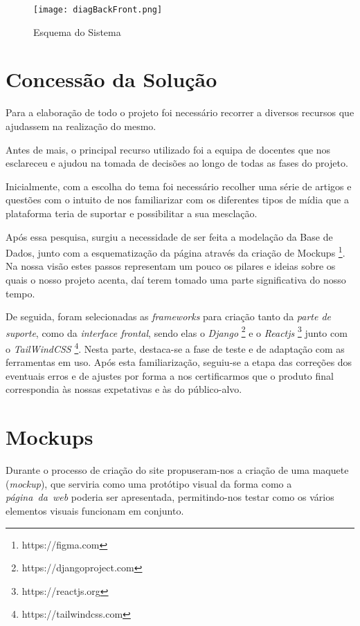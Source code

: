 \documentclass[11pt,a4paper]{report}
\begin{document}
\begin{figure}[h]
    \centering
    \texttt{[image: diagBackFront.png]}
    \caption{Esquema do Sistema}
    \label{fig:sis}
\end{figure}

\chapter{Concessão da Solução}

Para a elaboração de todo o projeto foi necessário recorrer a diversos recursos que ajudassem na realização do mesmo.

Antes de mais, o principal recurso utilizado foi a equipa de docentes que nos esclareceu e ajudou na tomada de decisões ao longo de todas as fases do projeto.

Inicialmente, com a escolha do tema foi necessário recolher uma série de artigos e questões com o intuito de nos familiarizar com os diferentes tipos de mídia que a plataforma teria de suportar e possibilitar a sua mesclação. 

Após essa pesquisa, surgiu a necessidade de ser feita a modelação da Base de Dados, junto com a esquematização da página através da criação de Mockups \footnote{https://figma.com}. Na nossa visão estes passos representam um pouco os pilares e ideias sobre os quais o nosso projeto acenta, daí terem tomado uma parte significativa do nosso tempo.

De seguida, foram selecionadas as \emph{frameworks} para criação tanto da \emph{parte de suporte}, como da \emph{interface frontal}, sendo elas o \emph{Django} \footnote{https://djangoproject.com} e o \emph{Reactjs} \footnote{https://reactjs.org} junto com o \emph{TailWindCSS} \footnote{https://tailwindcss.com}. Nesta parte, destaca-se a fase de teste e de adaptação com as ferramentas em uso. Após esta familiarização, seguiu-se a etapa das correções dos eventuais erros e de ajustes por forma a nos certificarmos que o produto final correspondia às nossas expetativas e às do público-alvo.

\chapter{Mockups}

Durante o processo de criação do site propuseram-nos a criação de uma maquete (\emph{mockup}), que serviria como uma protótipo visual da forma como a \emph{página\ da\ web} poderia ser apresentada, permitindo-nos testar como os vários elementos visuais funcionam em conjunto.
\end{document}
